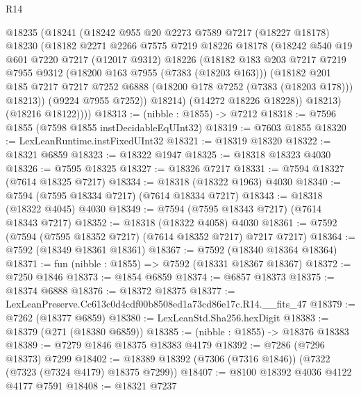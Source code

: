 \begin{lexlean}{R14}
\begin{coremodule}
        @18235
          (@18241
            (@18242
              @955
              @20
              @2273
              @7589
              @7217
              (@18227 @18178)
              @18230
              (@18182
                @2271
                @2266
                @7575
                @7219
                @18226
                @18178
                (@18242
                  @540
                  @19
                  @601
                  @7220
                  @7217
                  (@12017 @9312)
                  @18226
                  (@18182
                    @183
                    @203
                    @7217
                    @7219
                    @7955
                    @9312
                    (@18200 @163 @7955 (@7383 (@18203 @163)))
                    (@18182
                      @201
                      @185
                      @7217
                      @7217
                      @7252
                      @6888
                      (@18200 @178 @7252 (@7383 (@18203 @178)))
                      @18213))
                  (@9224 @7955 @7252))
                @18214)
              (@14272 @18226 @18228))
            @18213)
          (@18216 @18122))))
@18313 := (nibble : @1855) -> @7212
@18318 := @7596 @1855 (@7598 @1855 instDecidableEqUInt32)
@18319 := @7603 @1855
@18320 := LexLeanRuntime.instFixedUInt32
@18321 := @18319 @18320
@18322 := @18321 @6859
@18323 := @18322 @1947
@18325 := @18318 @18323 @4030
@18326 := @7595 @18325
@18327 := @18326 @7217
@18331 := @7594 @18327 (@7614 @18325 @7217)
@18334 := @18318 (@18322 @1963) @4030
@18340 := @7594 (@7595 @18334 @7217) (@7614 @18334 @7217)
@18343 := @18318 (@18322 @4045) @4030
@18349 := @7594 (@7595 @18343 @7217) (@7614 @18343 @7217)
@18352 := @18318 (@18322 @4058) @4030
@18361 := @7592 (@7594 (@7595 @18352 @7217) (@7614 @18352 @7217) @7217 @7217)
@18364 := @7592 (@18349 @18361 @18361)
@18367 := @7592 (@18340 @18364 @18364)
@18371 := fun (nibble : @1855) => @7592 (@18331 @18367 @18367)
@18372 := @7250 @1846
@18373 := @1854 @6859
@18374 := @6857 @18373
@18375 := @18374 @6888
@18376 := @18372 @18375
@18377 := LexLeanPreserve.Cc613c0d4cdf00b8508ed1a73cd86e17c.R14.__fits_47
@18379 := @7262 (@18377 @6859)
@18380 := LexLeanStd.Sha256.hexDigit
@18383 := @18379 (@271 (@18380 @6859))
@18385 := (nibble : @1855) -> @18376 @18383
@18389 := @7279 @1846 @18375 @18383 @4179
@18392 := @7286 (@7296 @18373) @7299
@18402 := @18389 @18392 (@7306 (@7316 @1846)) (@7322 (@7323 (@7324 @4179) @18375 @7299))
@18407 := @8100 @18392 @4036 @4122 @4177 @7591
@18408 := @18321 @7237

\end{coremodule}
\end{lexlean}
